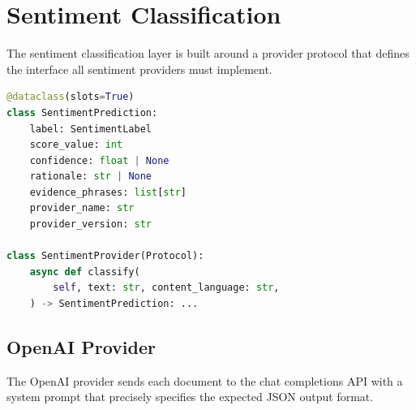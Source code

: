 \section{Sentiment Classification}
\label{sec:sentiment_impl}

The sentiment classification layer is built around a provider protocol that defines the interface all sentiment providers must implement.

\begin{lstlisting}[language=Python, caption={Sentiment provider protocol and prediction data class}]
@dataclass(slots=True)
class SentimentPrediction:
    label: SentimentLabel
    score_value: int
    confidence: float | None
    rationale: str | None
    evidence_phrases: list[str]
    provider_name: str
    provider_version: str

class SentimentProvider(Protocol):
    async def classify(
        self, text: str, content_language: str,
    ) -> SentimentPrediction: ...
\end{lstlisting}

\subsection{OpenAI Provider}

The OpenAI provider sends each document to the chat completions API with a system prompt that precisely specifies the expected JSON output format.

